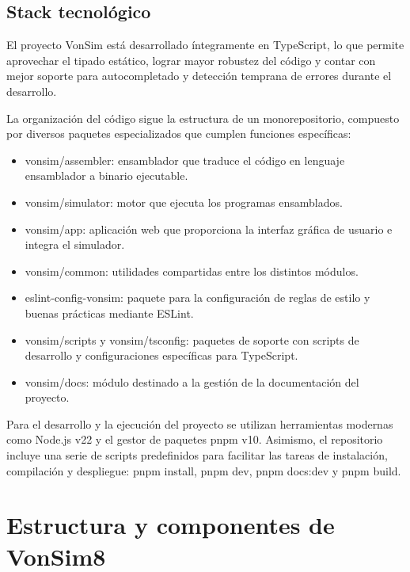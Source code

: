 \documentclass[12pt,oneside]{templates/unerthesis}
\providecommand{\tightlist}{%
  \setlength{\itemsep}{0pt}\setlength{\parskip}{0pt}}
\begin{document}
\hypertarget{stack-tecnoluxf3gico}{%
\subsection{Stack tecnológico}\label{stack-tecnoluxf3gico}}

El proyecto VonSim está desarrollado íntegramente en TypeScript, lo que permite aprovechar el tipado estático, lograr mayor robustez del código y contar con mejor soporte para autocompletado y detección temprana de errores durante el desarrollo.

La organización del código sigue la estructura de un monorepositorio, compuesto por diversos paquetes especializados que cumplen funciones específicas:

\begin{itemize}
\tightlist
\item
  vonsim/assembler: ensamblador que traduce el código en lenguaje ensamblador a binario ejecutable.
\item
  vonsim/simulator: motor que ejecuta los programas ensamblados.
\item
  vonsim/app: aplicación web que proporciona la interfaz gráfica de usuario e integra el simulador.
\item
  vonsim/common: utilidades compartidas entre los distintos módulos.
\item
  eslint-config-vonsim: paquete para la configuración de reglas de estilo y buenas prácticas mediante ESLint.
\item
  vonsim/scripts y vonsim/tsconfig: paquetes de soporte con scripts de desarrollo y configuraciones específicas para TypeScript.
\item
  vonsim/docs: módulo destinado a la gestión de la documentación del proyecto.
\end{itemize}

Para el desarrollo y la ejecución del proyecto se utilizan herramientas modernas como Node.js v22 y el gestor de paquetes pnpm v10. Asimismo, el repositorio incluye una serie de scripts predefinidos para facilitar las tareas de instalación, compilación y despliegue: pnpm install, pnpm dev, pnpm docs:dev y pnpm build.

\hypertarget{estructura-y-componentes-de-vonsim8}{%
\section{Estructura y componentes de VonSim8}\label{estructura-y-componentes-de-vonsim8}}
\end{document}
